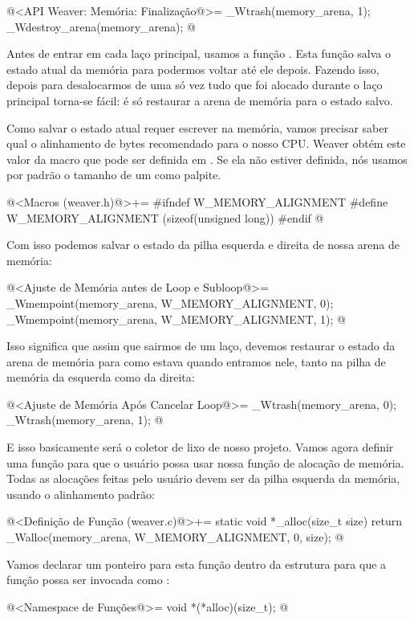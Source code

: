 \iniciocodigo
@<API Weaver: Memória: Finalização@>=
_Wtrash(memory_arena, 1);
_Wdestroy_arena(memory_arena);
@
\fimcodigo

Antes de entrar em cada laço principal, usamos a
função . Esta função salva o estado atual da
memória para podermos voltar até ele depois. Fazendo isso, depois para
desalocarmos de uma só vez tudo que foi alocado durante o laço
principal torna-se fácil: é só restaurar a arena de memória para o
estado salvo.

Como salvar o estado atual requer escrever na memória, vamos precisar
saber qual o alinhamento de bytes recomendado para o nosso CPU. Weaver
obtém este valor da macro  que pode
ser definida em . Se ela não estiver definida,
nós usamos por padrão o tamanho de um  como
palpite.

\iniciocodigo
@<Macros (weaver.h)@>+=
#ifndef W_MEMORY_ALIGNMENT
#define W_MEMORY_ALIGNMENT (sizeof(unsigned long))
#endif
@
\fimcodigo

Com isso podemos salvar o estado da pilha esquerda e direita de nossa
arena de memória:

\iniciocodigo
@<Ajuste de Memória antes de Loop e Subloop@>=
_Wmempoint(memory_arena, W_MEMORY_ALIGNMENT, 0);
_Wmempoint(memory_arena, W_MEMORY_ALIGNMENT, 1);
@
\fimcodigo

Isso significa que assim que sairmos de um laço, devemos restaurar o
estado da arena de memória para como estava quando entramos nele,
tanto na pilha de memória da esquerda como da direita:

\iniciocodigo
@<Ajuste de Memória Após Cancelar Loop@>=
_Wtrash(memory_arena, 0);
_Wtrash(memory_arena, 1);
@
\fimcodigo

E isso basicamente será o coletor de lixo de nosso projeto. Vamos
agora definir uma função para que o usuário possa usar nossa função de
alocação de memória. Todas as alocações feitas pelo usuário devem ser
da pilha esquerda da memória, usando o alinhamento padrão:

\iniciocodigo
@<Definição de Função (weaver.c)@>+=
static void *_alloc(size_t size){
  return _Walloc(memory_arena, W_MEMORY_ALIGNMENT, 0, size);
}
@
\fimcodigo

Vamos declarar um ponteiro para esta função dentro da
estrutura  para que a função possa ser invocada
como :

\iniciocodigo
@<Namespace de Funções@>=
void *(*alloc)(size_t);
@
\fimcodigo

